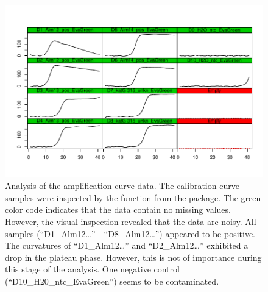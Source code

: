 \begin{figure}[htbp]
  \centering
  \includegraphics[clip=true, width=14cm]{figures/plotCurves.pdf}
  \caption{Analysis of the amplification curve data. The calibration curve 
samples were inspected by the  function from the 
 package. The green color code indicates that the data contain 
no missing values. However, the visual inspection revealed that the data are 
noisy. All samples (``D1\_Alm12\ldots'' - ``D8\_Alm12\ldots'') appeared to be 
positive. The curvatures of ``D1\_Alm12\ldots'' and ``D2\_Alm12\ldots'' 
exhibited a drop in the plateau phase. However, this is not of importance during 
this stage of the analysis. One negative control (``D10\_H20\_ntc\_EvaGreen'') 
seems to be contaminated.}
  \label{figure:plotCurves}
\end{figure}


